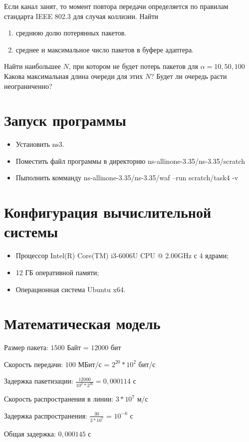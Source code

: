 \documentclass[a4paper, 14pt]{extarticle}
\begin{document}
Если канал занят, то момент повтора передачи определяется по правилам стандарта IEEE 802.3 для случая коллизии.
Найти
\begin{enumerate}
    \item среднюю долю потерянных пакетов.
    \item среднее и максимальное число пакетов в буфере адаптера.
\end{enumerate}
Найти наибольшее $N$, при котором не будет потерь пакетов для $\alpha = 10, 50, 100$
Какова максимальная длина очереди для этих $N$?
Будет ли очередь расти неограниченно?

\section{Запуск программы}
\begin{itemize}
    \item Установить ns3.
    \item Поместить файл программы в директорию ns-allinone-3.35/ns-3.35/scratch
    \item Пыполнить комманду ns-allinone-3.35/ns-3.35/waf --run scratch/task4 -v
\end{itemize}

\section{Конфигурация вычислительной системы}
\begin{itemize}
    \item Процессор Intel(R) Core(TM) i3-6006U CPU @ 2.00GHz с 4 ядрами;
    \item 12 ГБ оперативной памяти;
    \item Операционная система Ubuntu x64.
\end{itemize}

\section{Математическая модель}
Размер пакета: $1500$ Байт = $12000$ бит

Скорость передачи: $100$ МБит/с = $2^20 * 10^2$ бит/с

Задержка пакетизации: $\frac{12000}{10^2 * 2^20} = 0,000114$ с

Скорость распространения в линии: $3 * 10^7$ м/с

Задержка распространения: $\frac{30}{3 * 10^7}$ = $10^{-6}$ с

Общая задержка: $0,000145$ с
\end{document}
